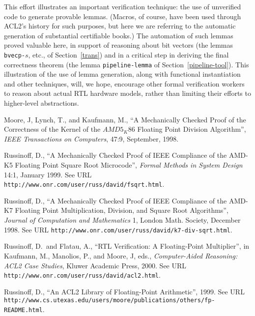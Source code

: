 \documentclass{article}
\begin{document}
This effort illustrates an important verification technique: the use
of unverified code to generate provable lemmas.  (Macros, of course,
have been used through ACL2's history for such purposes, but here we
are referring to the automatic generation of substantial certifiable
books.)  The automation of such lemmas proved valuable here, in
support of reasoning about bit vectors (the lemmas {\tt bvecp-}$s$,
etc., of Section~\ref{trans}) and in a critical step in deriving the
final correctness theorem (the lemma {\tt pipeline-lemma} of
Section~\ref{pipeline-tool}).  This illustration of the use of lemma
generation, along with functional instantiation and other techniques,
will, we hope, encourage other formal verification workers to reason
about actual RTL hardware models, rather than limiting their efforts
to higher-level abstractions.


\begin{thebibliography}{3}

Moore, J, Lynch, T., and Kaufmann, M., ``A Mechanically Checked Proof
of the Correctness of the Kernel of the $AMD5_{K}86$ Floating Point Division Algorithm'',
{\it IEEE Transactions on Computers}, 47:9, September, 1998. 

Russinoff, D., ``A Mechanically Checked Proof of IEEE Compliance of the AMD-K5
Floating Point Square Root Microcode'', {\it Formal Methods in System Design} 
14:1, January 1999. See URL {\tt http://www.onr.com/user/russ/david/fsqrt.html}.

Russinoff, D., ``A Mechanically Checked Proof of IEEE Compliance of the AMD-K7
Floating Point Multiplication, Division, and Square Root Algorithms'', {\it Journal of
Computation and Mathematics} 1, London Math. Society, December 1998.  See URL 
{\tt http://www.onr.com/user/russ/david/k7-div-sqrt.html}.

Russinoff, D.\ and Flatau, A., ``RTL Verification: A Floating-Point Multiplier'',
in Kaufmann, M., Manolios, P., and Moore, J, eds., {\it Computer-Aided Reasoning: ACL2 Case Studies},
Kluwer Academic Press, 2000.  See URL {\tt http://www.onr.com/user/russ/david/acl2.html}.

Russinoff, D., ``An ACL2 Library of Floating-Point Arithmetic'', 1999.
See URL {\tt http://www.cs.utexas.edu/users/moore/publications/others/\-fp-README.html}.

\end{thebibliography}
\end{document}
